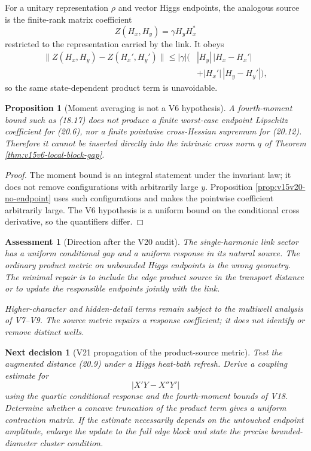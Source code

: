 \documentclass[11pt]{article}
\newtheorem{proposition}[theorem]{Proposition}
\newtheorem{decision}[theorem]{Next decision}
\newtheorem{assessment}[theorem]{Assessment}
\theoremstyle{remark}
\begin{document}
For a unitary representation \(\rho\) and vector Higgs endpoints,
the analogous source is the finite-rank matrix coefficient
\[
 Z(H_x,H_y)=\gamma H_yH_x^*                                \tag{20.11}
\]
restricted to the representation carried by the link.  It obeys
\[
\begin{aligned}
 \|Z(H_x,H_y)-Z(H_x',H_y')\|
 \le|\gamma|\bigl(
 &|H_y|\,|H_x-H_x'|\\
 &+|H_x'|\,|H_y-H_y'|
 \bigr),                                                    \tag{20.12}
\end{aligned}
\]
so the same state-dependent product term is unavoidable.

\begin{proposition}[Moment averaging is not a V6 hypothesis]
\label{prop:v15v20-moment-not-sup}
A fourth-moment bound such as (18.17) does not produce a finite
worst-case endpoint Lipschitz coefficient for (20.6), nor a finite
pointwise cross-Hessian supremum for (20.12).  Therefore it cannot
be inserted directly into the intrinsic cross norm \(q\) of
Theorem \ref{thm:v15v6-local-block-gap}.
\end{proposition}

\begin{proof}
The moment bound is an integral statement under the invariant law;
it does not remove configurations with arbitrarily large \(y\).
Proposition \ref{prop:v15v20-no-endpoint} uses such configurations
and makes the pointwise coefficient arbitrarily large.  The V6
hypothesis is a uniform bound on the conditional cross derivative,
so the quantifiers differ.
\end{proof}

\begin{assessment}[Direction after the V20 audit]
\label{ass:v15v20-direction}
The single-harmonic link sector has a uniform conditional gap and a
uniform response in its natural source.  The ordinary product
metric on unbounded Higgs endpoints is the wrong geometry.  The
minimal repair is to include the edge product source in the
transport distance or to update the responsible endpoints jointly
with the link.

Higher-character and hidden-detail terms remain subject to the
multiwell analysis of V7--V9.  The source metric repairs a response
coefficient; it does not identify or remove distinct wells.
\end{assessment}

\begin{decision}[V21 propagation of the product-source metric]
\label{dec:v15v20-next}
Test the augmented distance (20.9) under a Higgs heat-bath refresh.
Derive a coupling estimate for
\[
 |X'Y-X''Y'|
\]
using the quartic conditional response and the fourth-moment bounds
of V18.  Determine whether a concave truncation of the product term
gives a uniform contraction matrix.  If the estimate necessarily
depends on the untouched endpoint amplitude, enlarge the update to
the full edge block and state the precise bounded-diameter cluster
condition.
\end{decision}
\end{document}
